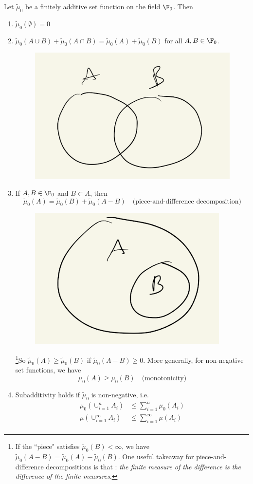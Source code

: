 \documentclass{article} %
\newcommand{\fasf}{\tilde{\mu}_0}
\begin{document}
 \begin{theorem}
 Let $\fasf$ be a finitely additive set function on the field $\F_0$.  Then
 \begin{enumerate}[label=\alph*)]
 \item \label{itm:first} $\fasf(\emptyset)=0$
 \item \label{itm:second} $\fasf(A \cup B) + \fasf (A \cap B) = \fasf(A) + \fasf(B)$ for all $A,B \in \F_0$.
 \begin{figure}[H]
 \centering
 \includegraphics[width=.2\textwidth]{images/two_overlapping_sets}	
 \end{figure}

 \item \label{itm:piece-and-difference} If $A,B \in \F_0$ and $B \subset A$, then   
  \[ \fasf(A) = \fasf(B) + \fasf(A-B)\quad \text{(piece-and-difference decomposition)} \] 
 \begin{figure}[H]
 \centering
 \includegraphics[width=.2\textwidth]{images/whole_and_piece}	
 \end{figure}
 
 \footnote{If the ``piece" satisfies $\fasf(B) < \infty$, we have $\fasf(A-B) = \fasf(A) - \fasf(B) $.  One useful takeaway for piece-and-difference decompositions is that : \textit{the finite measure of the difference is the difference of the finite measures}.}So $\fasf(A) \geq \fasf(B)$ if $\fasf(A-B) \geq 0$. More generally, for non-negative set functions, we have
 \[ \mu_0 (A) \geq \mu_0 (B) \quad \text{(monotonicity)} \] 
 \item \label{itm:subadditivity} Subadditivity holds if $\fasf$ is non-negative, i.e.
 \begin{align*}
 \mu_0 (\cup_{i=1}^n A_i)& \leq \sum_{i=1}^n \mu_0(A_i) \\
  \mu (\cup_{i=1}^\infty A_i)& \leq \sum_{i=1}^\infty \mu(A_i) \\
 \end{align*}
 \end{enumerate}
\label{thm:basic_properties_of_finitely_additive_set_functions}
 \end{theorem}
  
\end{document}
